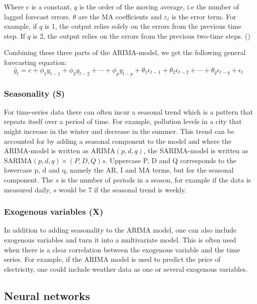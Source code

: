 Where c is a constant, $q$ is the order of the moving average, i.e the number of lagged forecast errors. $\theta$ are the MA coefficients and $\varepsilon_{t}$ is the error term. For example, if $q$ is 1, the output relies solely on the errors from the previous time step. If $q$ is 2, the output relies on the errors from the previous two-time steps. (\cite{hyndman_athanasopoulos_2021}) 

Combining these three parts of the ARIMA-model, we get the following general forecasting equation:
\begin{equation}
\hat{y}_t = c + \phi_1y_{t-1} + \phi_2y_{t-2} + \cdots + \phi_py_{t-p} + \theta_1\epsilon_{t-1} + \theta_2\epsilon_{t-2} + \cdots + \theta_q\epsilon_{t-q} + \epsilon_t
\end{equation}

\subsubsection{Seasonality (S)}\label{SeasonalityTheory}
For time-series data there can often incur a seasonal trend which is a pattern that repeats itself over a period of time. For example, pollution levels in a city that might increase in the winter and decrease in the summer. This trend can be accounted for by adding a seasonal component to the model and where the ARIMA-model is written as ARIMA$(p,d,q)$, the SARIMA-model is written as SARIMA$(p,d,q) \times (P,D,Q)s$. Uppercase P, D and Q corresponds to the lowercase p, d and q, namely the AR, I and MA terms, but for the seasonal component. The $s$ is the number of periods in a season, for example if the data is measured daily, $s$ would be 7 if the seasonal trend is weekly.~\parencite{chang_et_al_2012}

\subsubsection{Exogenous variables (X)}\label{ExogenousTheory}
In addition to adding seasonality to the ARIMA model, one can also include exogenous variables and turn it into a multivariate model. This is often used when there is a clear correlation between the exogenous variable and the time series. For example, if the ARIMA model is used to predict the price of electricity, one could include weather data as one or several exogenous variables.~\parencite{elamin_fukushige_2018}

\subsection{Neural networks}
